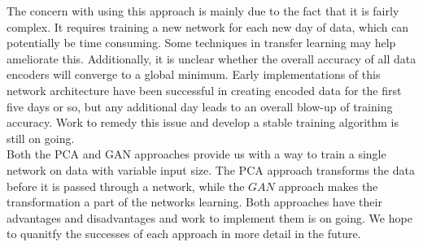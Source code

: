\documentclass[12pt]{article}
\begin{document}
\indent The concern with using this approach is mainly due to the fact that it is fairly complex. It requires training a new network for each new day of data, which can potentially be time consuming. Some techniques in transfer learning may help ameliorate this. Additionally, it is unclear whether the overall accuracy of all data encoders will converge to a global minimum. Early implementations of this network architecture have been successful in creating encoded data for the first five days or so, but any additional day leads to an overall blow-up of training accuracy. Work to remedy this issue and develop a stable training algorithm is still on going. \\
\indent Both the PCA and GAN approaches provide us with a way to train a single network on data with variable input size. The PCA approach transforms the data before it is passed through a network, while the $GAN$ approach makes the transformation a part of the networks learning. Both approaches have their advantages and disadvantages and work to implement them is on going. We hope to quanitfy the successes of each approach in more detail in the future.
\end{document}
